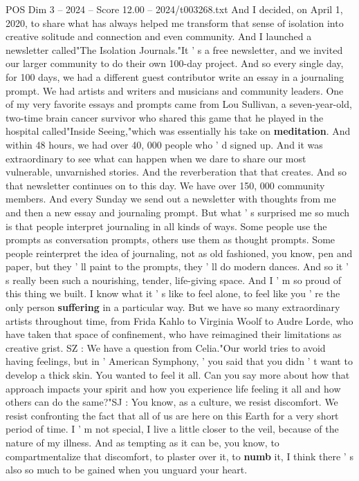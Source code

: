 \begin{textsample}{POS Dim 3 – 2024 – Score 12.00 – 2024/t003268.txt}
And I decided, on April 1, 2020, to share what has always helped me transform that sense of isolation into creative solitude and connection and even community.
And I launched a newsletter called"The Isolation Journals."It ' s a free newsletter, and we invited our larger community to do their own 100-day project.
And so every single day, for 100 days, we had a different guest contributor write an essay in a journaling prompt.
We had artists and writers and musicians and community leaders.
One of my very favorite essays and prompts came from Lou Sullivan, a seven-year-old, two-time brain cancer survivor who shared this game that he played in the hospital called"Inside Seeing,"which was essentially his take on \textbf{meditation}.
And within 48 hours, we had over 40, 000 people who ' d signed up.
And it was extraordinary to see what can happen when we dare to share our most vulnerable, unvarnished stories.
And the reverberation that that creates.
And so that newsletter continues on to this day.
We have over 150, 000 community members.
And every Sunday we send out a newsletter with thoughts from me and then a new essay and journaling prompt.
But what ' s surprised me so much is that people interpret journaling in all kinds of ways.
Some people use the prompts as conversation prompts, others use them as thought prompts.
Some people reinterpret the idea of journaling, not as old fashioned, you know, pen and paper, but they ' ll paint to the prompts, they ' ll do modern dances.
And so it ' s really been such a nourishing, tender, life-giving space.
And I ' m so proud of this thing we built.
I know what it ' s like to feel alone, to feel like you ' re the only person \textbf{suffering} in a particular way.
But we have so many extraordinary artists throughout time, from Frida Kahlo to Virginia Woolf to Audre Lorde, who have taken that space of confinement, who have reimagined their limitations as creative grist.
SZ : We have a question from Celia."Our world tries to avoid having feelings, but in ' American Symphony, ' you said that you didn ' t want to develop a thick skin.
You wanted to feel it all.
Can you say more about how that approach impacts your spirit and how you experience life feeling it all and how others can do the same?"SJ : You know, as a culture, we resist discomfort.
We resist confronting the fact that all of us are here on this Earth for a very short period of time.
I ' m not special, I live a little closer to the veil, because of the nature of my illness.
And as tempting as it can be, you know, to compartmentalize that discomfort, to plaster over it, to \textbf{numb} it, I think there ' s also so much to be gained when you unguard your heart.

\end{textsample}
